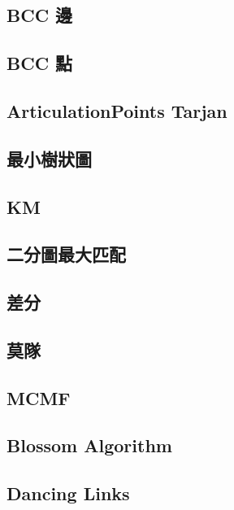     \subsection{BCC 邊}
         \columnbreak
    \subsection{BCC 點}
         \columnbreak
    \subsection{ArticulationPoints Tarjan}
         \columnbreak
    \subsection{最小樹狀圖}
         \columnbreak
    \subsection{KM}
        
    \subsection{二分圖最大匹配}
        
    \subsection{差分}
         \columnbreak
    \subsection{莫隊}
        
    \subsection{MCMF}
         \columnbreak
    \subsection{Blossom Algorithm}
        
    \subsection{Dancing Links}
        
